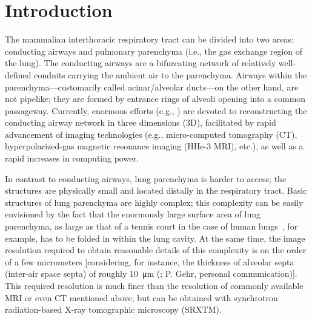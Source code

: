 \section{Introduction}
The mammalian interthoracic respiratory tract can be divided into two areas: conducting airways and pulmonary parenchyma (i.e., the gas exchange region of the lung). The conducting airways are a bifurcating network of relatively well-defined conduits carrying the ambient air to the parenchyma. Airways within the parenchyma---customarily	called	acinar/alveolar ducts---on the other hand, are not pipelike; they are formed by entrance rings of alveoli opening into a common passageway. Currently, enormous efforts (e.g., \cite{Aykac2003,Chaturvedi2005,Cheng2007,Chooi2004,Dame2006,Driehuys2007,Kvistedal2005,Ley2008,Scadeng2007,Sera2003,Tawhai2004,VanErtbruggen2005}) are devoted to reconstructing the conducting airway network in three dimensions (3D), facilitated by rapid advancement of imaging technologies (e.g., micro-computed tomography (\micro CT), hyperpolarized-gas magnetic resonance imaging (HHe-3 MRI), etc.), as well as a rapid increases in computing power.

In contrast to conducting airways, lung parenchyma is harder to access; the structures are physically small and located distally in the respiratory tract. Basic structures of lung parenchyma are highly complex; this complexity can be easily envisioned by the fact that the enormously large surface area of lung parenchyma, as large as that of a tennis court in the case of human lungs~\cite{Gehr1978,Weibel1963}, for example, has to be folded in within the lung cavity. At the same time, the image resolution required to obtain reasonable details of this complexity is on the order of a few micrometers [considering, for instance, the thickness of alveolar septa (inter-air space septa) of roughly \SI{10}{\micro\meter} (\cite{Gehr1978}; P. Gehr, personal communication)]. This required resolution is much finer than the resolution of commonly available MRI or even \micro CT mentioned above, but can be obtained with synchrotron radiation-based X-ray tomographic microscopy (SRXTM).

